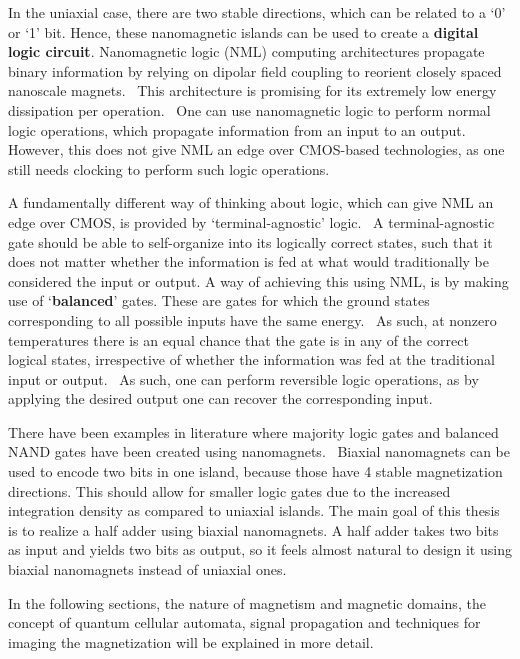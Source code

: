 \documentclass[11pt,a4paper,english]{article}
\begin{document}
In the uniaxial case, there are two stable directions, which can be related to a `0' or `1' bit. Hence, these nanomagnetic islands can be used to create a \textbf{digital logic circuit}. Nanomagnetic logic (NML) computing architectures propagate binary information by relying on dipolar field coupling to reorient closely spaced nanoscale magnets.~\cite{SubnanosecondPropagation_AnisotropyChains} This architecture is promising for its extremely low energy dissipation per operation.~\cite{SubnanosecondPropagation_AnisotropyChains,FourStateLogic,MQCA_RoomTemp} One can use nanomagnetic logic to perform normal logic operations, which propagate information from an input to an output. However, this does not give NML an edge over CMOS-based technologies, as one still needs clocking to perform such logic operations. \par 
A fundamentally different way of thinking about logic, which can give NML an edge over CMOS, is provided by `terminal-agnostic' logic.~\cite{FactorizationMemcomputing} A terminal-agnostic gate should be able to self-organize into its logically correct states, such that it does not matter whether the information is fed at what would traditionally be considered the input or output. A way of achieving this using NML, is by making use of `\textbf{balanced}' gates. These are gates for which the ground states corresponding to all possible inputs have the same energy.~\cite{GYP-18} As such, at nonzero temperatures there is an equal chance that the gate is in any of the correct logical states, irrespective of whether the information was fed at the traditional input or output.~\cite{gypens2020nanomagnetic} As such, one can perform reversible logic operations, as by applying the desired output one can recover the corresponding input. \par %
There have been examples in literature where majority logic gates and balanced NAND gates have been created using nanomagnets.~\cite{GYP-18} Biaxial nanomagnets can be used to encode two bits in one island, because those have 4 stable magnetization directions. This should allow for smaller logic gates due to the increased integration density as compared to uniaxial islands. The main goal of this thesis is to realize a half adder using biaxial nanomagnets. A half adder takes two bits as input and yields two bits as output, so it feels almost natural to design it using biaxial nanomagnets instead of uniaxial ones.


In the following sections, the nature of magnetism and magnetic domains, the concept of quantum cellular automata, signal propagation and techniques for imaging the magnetization will be explained in more detail.
\end{document}
